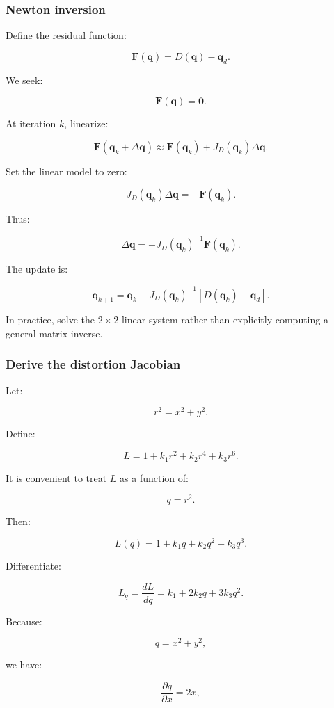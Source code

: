\subsubsection{Newton inversion}\label{newton-inversion}

Define the residual function:

\[
 \boxed{ \mathbf F(\mathbf q)= D(\mathbf q)-\mathbf q_d }.
\]

We seek:

\[
 \mathbf F(\mathbf q)=\mathbf0.
\]

At iteration \(k\), linearize:

\[
 \mathbf F(\mathbf q_k+\Delta\mathbf q) \approx \mathbf F(\mathbf q_k)+J_D(\mathbf q_k)\Delta\mathbf q.
\]

Set the linear model to zero:

\[
 J_D(\mathbf q_k)\Delta\mathbf q = -\mathbf F(\mathbf q_k).
\]

Thus:

\[
 \boxed{ \Delta\mathbf q = -J_D(\mathbf q_k)^{-1} \mathbf F(\mathbf q_k) }.
\]

The update is:

\[
 \boxed{ \mathbf q_{k+1} = \mathbf q_k- J_D(\mathbf q_k)^{-1} [D(\mathbf q_k)-\mathbf q_d] }.
\]

In practice, solve the \(2\times2\) linear system rather than explicitly computing a general matrix inverse.

\subsubsection{Derive the distortion Jacobian}\label{derive-the-distortion-jacobian}

Let:

\[
 r^2=x^2+y^2.
\]

Define:

\[
 L=1+k_1r^2+k_2r^4+k_3r^6.
\]

It is convenient to treat \(L\) as a function of:

\[
 q=r^2.
\]

Then:

\[
 L(q)=1+k_1q+k_2q^2+k_3q^3.
\]

Differentiate:

\[
 \boxed{ L_q=\frac{dL}{dq} = k_1+2k_2q+3k_3q^2 }.
\]

Because:

\[
 q=x^2+y^2,
\]

we have:

\[
 \frac{\partial q}{\partial x}=2x,
\]

